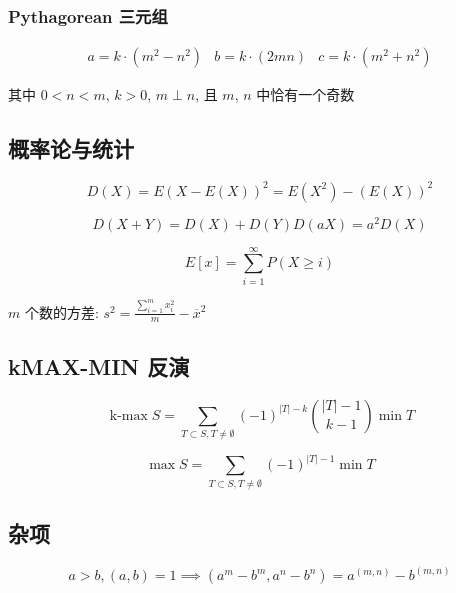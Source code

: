 \subsubsection{Pythagorean 三元组}

\[
    \begin{array}{ccc}
        a=k\cdot\left(m^2-n^2\right) & b=k\cdot\left(2mn\right) & c=k\cdot\left(m^2+n^2\right)
    \end{array}
\]

其中 \(0<n<m\), \(k>0\), \(m\perp n\), 且 \(m\), \(n\) 中恰有一个奇数

\subsection{概率论与统计}

\begin{equation}
    D(X)=E(X-E(X))^2=E\left(X^2\right)-(E(X))^2
\end{equation}

\begin{equation}
    D(X+Y)=D(X)+D(Y)D(aX)=a^2D(X)
\end{equation}

\begin{equation}
    E[x]=\sum_{i=1}^{\infty}P(X\geq i)
\end{equation}

\(m\) 个数的方差: \(\displaystyle s^2=\frac{\sum_{i=1}^m x_i^2}m-\overline x^2\)

\subsection{kMAX-MIN 反演}

\begin{equation}
    \operatorname{k-max} S=\sum_{T\subset S, T\neq \emptyset}(-1)^{|T|-k}\binom{|T|-1}{k-1}\min T
\end{equation}

\begin{equation}
    \max S=\sum_{T\subset S, T\neq \emptyset}(-1)^{|T|-1}\min T
\end{equation}

\subsection{杂项}

\begin{equation}
    a>b,(a,b)=1 \implies (a^m-b^m,a^n-b^n)=a^{(m,n)}-b^{(m,n)}
\end{equation}

